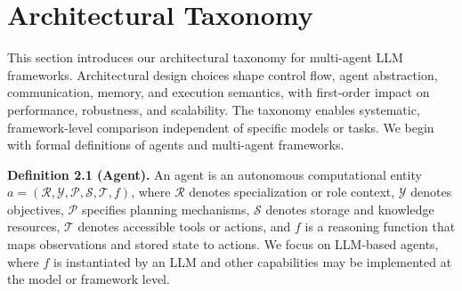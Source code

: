 \section{Architectural Taxonomy}
\label{sec:taxonomy_analysis}

This section introduces our architectural taxonomy for multi-agent LLM frameworks. Architectural design choices shape control flow, agent abstraction, communication, memory, and execution semantics, with first-order impact on performance, robustness, and scalability. The taxonomy enables systematic, framework-level comparison independent of specific models or tasks. We begin with formal definitions of agents and multi-agent frameworks.








\noindent\textbf{Definition 2.1 (Agent).}
An agent is an autonomous computational entity
$a = (\mathcal{R}, \mathcal{Y}, \mathcal{P}, \mathcal{S}, \mathcal{T}, f)$,
where $\mathcal{R}$ denotes specialization or role context, $\mathcal{Y}$ denotes objectives, $\mathcal{P}$ specifies planning mechanisms, $\mathcal{S}$ denotes storage and knowledge resources, $\mathcal{T}$ denotes accessible tools or actions, and $f$ is a reasoning function that maps observations and stored state to actions. We focus on LLM-based agents, where $f$ is instantiated by an LLM and other capabilities may be implemented at the model or framework level.


